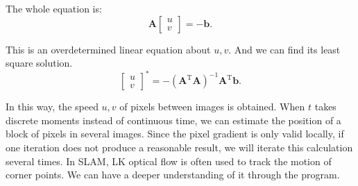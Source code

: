 The whole equation is:
\begin{equation}
\mathbf{A}\left[ \begin{array}{l}
u\\
v
\end{array} \right] =  - \mathbf{b}.
\end{equation}

This is an overdetermined linear equation about $u,v$. And we can find its least square solution.
\begin{equation}
{\left[ \begin{array}{l}
	u\\
	v
	\end{array} \right]^*} = -{\left( {{ \mathbf{A}^\mathrm{T}}\mathbf{A}} \right)^{ - 1}}{ \mathbf{A}^\mathrm{T}}\mathbf{b}.
\end{equation}

In this way, the speed $u,v$ of pixels between images is obtained. When $t$ takes discrete moments instead of continuous time, we can estimate the position of a block of pixels in several images. Since the pixel gradient is only valid locally, if one iteration does not produce a reasonable result, we will iterate this calculation several times. In SLAM, LK optical flow is often used to track the motion of corner points. We can have a deeper understanding of it through the program.

